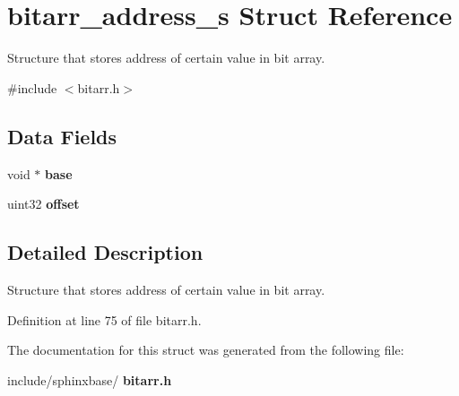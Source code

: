 \section{bitarr\+\_\+address\+\_\+s Struct Reference}
\label{structbitarr__address__s}


Structure that stores address of certain value in bit array.  




{\ttfamily \#include $<$bitarr.\+h$>$}

\subsection*{Data Fields}
\begin{DoxyCompactItemize}
\item 
\mbox{\label{structbitarr__address__s_a2ac6eb57a1f8feea9d3ab947af61cd26}} 
void $\ast$ {\bfseries base}
\item 
\mbox{\label{structbitarr__address__s_a25e454a04427113d373f6200a6c87de2}} 
uint32 {\bfseries offset}
\end{DoxyCompactItemize}


\subsection{Detailed Description}
Structure that stores address of certain value in bit array. 

Definition at line 75 of file bitarr.\+h.



The documentation for this struct was generated from the following file\+:\begin{DoxyCompactItemize}
\item 
include/sphinxbase/\textbf{ bitarr.\+h}\end{DoxyCompactItemize}
